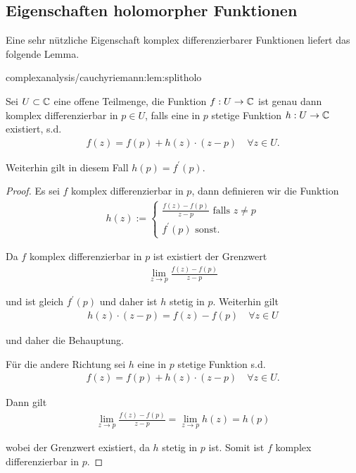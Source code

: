 \subsection{Eigenschaften holomorpher Funktionen}
\label{\detokenize{complexanalysis/cauchyriemann:eigenschaften-holomorpher-funktionen}}
\par
Eine sehr nützliche Eigenschaft komplex differenzierbarer Funktionen liefert das folgende Lemma.
\begin{lemma}{}{complexanalysis/cauchyriemann:lem:splitholo}



\par
Sei \(U \subset \mathbb{C}\) eine offene Teilmenge, die Funktion \(f:U\to\mathbb{C}\) ist genau dann komplex differenzierbar in \(p\in U\), falls eine in \(p\) stetige Funktion \(h:U\to\mathbb{C}\) existiert, s.d.
\begin{align*}
f(z) = f(p) + h(z)\cdot (z-p)\quad\forall z\in U.
\end{align*}
\par
Weiterhin gilt in diesem Fall \(h(p) = f^\prime(p)\).
\end{lemma}

\begin{proof}
 Es sei \(f\) komplex differenzierbar in \(p\), dann definieren wir die Funktion
\begin{align*}
h(z):=
\begin{cases}
\frac{f(z) - f(p)}{z-p}\text{ falls }z\neq p\\
f^\prime(p)\text{ sonst.}
\end{cases}
\end{align*}
\par
Da \(f\) komplex differenzierbar in \(p\) ist existiert der Grenzwert
\begin{align*}
\lim_{z\to p} \frac{f(z) - f(p)}{z-p}
\end{align*}
\par
und ist gleich \(f^\prime(p)\) und daher ist \(h\) stetig in \(p\). Weiterhin gilt
\begin{align*}
h(z)\cdot (z-p) = f(z) - f(p)\quad\forall z\in U
\end{align*}
\par
und daher die Behauptung.

\par
Für die andere Richtung sei \(h\) eine in \(p\) stetige Funktion s.d.
\begin{align*}
f(z) = f(p) + h(z)\cdot (z-p)\quad\forall z\in U.
\end{align*}
\par
Dann gilt
\begin{align*}
\lim_{z\to p} \frac{f(z) - f(p)}{z-p} = \lim_{z\to p} h(z) = h(p)
\end{align*}
\par
wobei der Grenzwert existiert, da \(h\) stetig in \(p\) ist. Somit ist \(f\) komplex differenzierbar in \(p\).
\end{proof}


